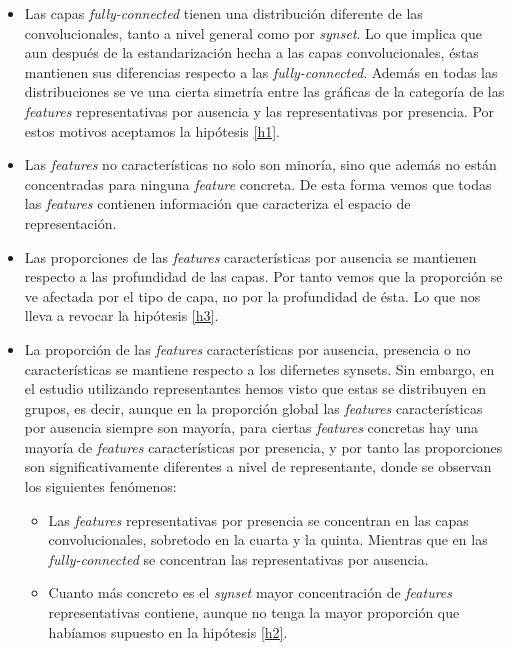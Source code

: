 \documentclass[12,twoside]{TFG-GM}
\theoremstyle{definition}
\theoremstyle{remark}
\begin{document}
\begin{itemize}
\item Las capas \textit{fully-connected} tienen una distribución diferente de las convolucionales, tanto a nivel general como por \textit{synset}. Lo que implica que aun después de la estandarización hecha a las capas convolucionales, éstas mantienen sus diferencias respecto a las \textit{fully-connected}. Además en todas las distribuciones se ve una cierta simetría entre las gráficas de la categoría de las \textit{features} representativas por ausencia y las representativas por presencia. Por estos motivos aceptamos la hipótesis \ref{h1}.

\item Las \textit{features} no características no solo son minoría, sino que además no están concentradas para ninguna \textit{feature} concreta. De esta forma vemos que todas las \textit{features} contienen información que caracteriza el espacio de representación. 

\item Las proporciones de las \textit{features} características por ausencia se mantienen respecto a las profundidad de las capas. Por tanto vemos que la proporción se ve afectada por el tipo de capa, no por la profundidad de ésta. Lo que nos lleva a revocar la hipótesis \ref{h3}.

\item La proporción de las \textit{features} características por ausencia, presencia o no características se mantiene respecto a los difernetes synsets. Sin embargo, en el estudio utilizando representantes hemos visto que estas se distribuyen en grupos, es decir, aunque en la proporción global las \textit{features} características por ausencia siempre son mayoría, para ciertas \textit{features} concretas hay una mayoría de \textit{features} características por presencia, y por tanto las proporciones son significativamente diferentes a nivel de representante, donde se observan los siguientes fenómenos: 

\begin{itemize}
\item Las \textit{features} representativas por presencia se concentran en las capas convolucionales, sobretodo en la cuarta y la quinta. Mientras que en las \textit{fully-connected} se concentran las representativas por ausencia. 
\item Cuanto más concreto es el \textit{synset} mayor concentración de \textit{features} representativas contiene, aunque no tenga la mayor proporción que habíamos supuesto en la hipótesis \ref{h2}. 
\end{itemize}


\end{itemize}
\end{document}

